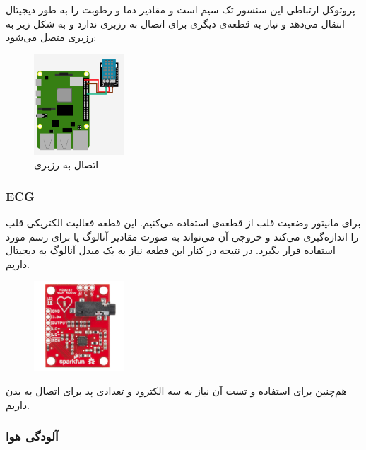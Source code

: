 \documentclass[12pt]{article}
\begin{document}
پروتوکل ارتباطی این سنسور تک سیم است و مقادیر دما و رطوبت را به طور دیجیتال انتقال می‌دهد و نیاز به قطعه‌‌ی دیگری برای 
اتصال به رزبری ندارد و به شکل زیر به رزبری متصل می‌شود:


\begin{figure}[h]
	\begin{center}
		\includegraphics[width=0.3\textwidth]{KY-015-raspberry}
	\end{center}
	\caption{اتصال  به رزبری}
\end{figure}


\subsubsection{ECG}

برای مانیتور وضعیت قلب از قطعه‌ی  استفاده می‌کنیم. این قطعه فعالیت الکتریکی قلب را اندازه‌گیری می‌کند و خروجی آن می‌تواند به صورت مقادیر آنالوگ یا برای رسم  مورد استفاده قرار بگیرد. در نتیجه در کنار این قطعه نیاز به یک مبدل آنالوگ به دیجیتال داریم. 


\begin{figure}[h]
	\begin{center}
		\includegraphics[width=0.3\textwidth]{AD8232}
	\end{center}
	\caption{}
\end{figure}

هم‌چنین برای استفاده و تست آن نیاز به سه الکترود و تعدادی پد برای اتصال به بدن داریم.



\subsubsection{آلودگی هوا}
\end{document}
